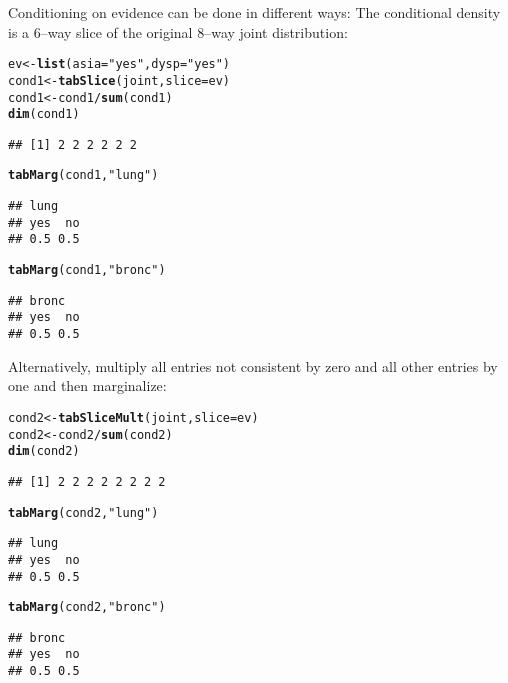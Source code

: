 \documentclass[10pt]{article}\usepackage[]{graphicx}\usepackage[]{xcolor}
\makeatletter
\newcommand{\hlstr}[1]{\textcolor[rgb]{0.192,0.494,0.8}{#1}}%
\newcommand{\hlopt}[1]{\textcolor[rgb]{0,0,0}{#1}}%
\newcommand{\hlstd}[1]{\textcolor[rgb]{0.345,0.345,0.345}{#1}}%
\newcommand{\hlkwb}[1]{\textcolor[rgb]{0.69,0.353,0.396}{#1}}%
\newcommand{\hlkwc}[1]{\textcolor[rgb]{0.333,0.667,0.333}{#1}}%
\newcommand{\hlkwd}[1]{\textcolor[rgb]{0.737,0.353,0.396}{\textbf{#1}}}%
\newenvironment{kframe}{%
 \def\at@end@of@kframe{}%
 \ifinner\ifhmode%
  \def\at@end@of@kframe{\end{minipage}}%
  \begin{minipage}{\columnwidth}%
 \fi\fi%
 \def\FrameCommand##1{\hskip\@totalleftmargin \hskip-\fboxsep
 \colorbox{shadecolor}{##1}\hskip-\fboxsep
     \hskip-\linewidth \hskip-\@totalleftmargin \hskip\columnwidth}%
 \MakeFramed {\advance\hsize-\width
   \@totalleftmargin\z@ \linewidth\hsize
   \@setminipage}}%
 {\par\unskip\endMakeFramed%
 \at@end@of@kframe}
\newenvironment{knitrout}{}{} %
\makeatother
\begin{document}
Conditioning on evidence can be done in different ways: The conditional density is a $6$--way slice of the original $8$--way joint distribution:
\begin{knitrout}
\color{fgcolor}\begin{kframe}
\begin{alltt}
\hlstd{ev} \hlkwb{<-} \hlkwd{list}\hlstd{(}\hlkwc{asia}\hlstd{=}\hlstr{"yes"}\hlstd{,} \hlkwc{dysp}\hlstd{=}\hlstr{"yes"}\hlstd{)}
\hlstd{cond1} \hlkwb{<-} \hlkwd{tabSlice}\hlstd{(joint,} \hlkwc{slice}\hlstd{=ev)}
\hlstd{cond1} \hlkwb{<-} \hlstd{cond1} \hlopt{/} \hlkwd{sum}\hlstd{(cond1)}
\hlkwd{dim}\hlstd{(cond1)}
\end{alltt}
\begin{verbatim}
## [1] 2 2 2 2 2 2
\end{verbatim}
\begin{alltt}
\hlkwd{tabMarg}\hlstd{(cond1,} \hlstr{"lung"}\hlstd{)}
\end{alltt}
\begin{verbatim}
## lung
## yes  no 
## 0.5 0.5
\end{verbatim}
\begin{alltt}
\hlkwd{tabMarg}\hlstd{(cond1,} \hlstr{"bronc"}\hlstd{)}
\end{alltt}
\begin{verbatim}
## bronc
## yes  no 
## 0.5 0.5
\end{verbatim}
\end{kframe}
\end{knitrout}

Alternatively, multiply all entries not consistent by zero and all other entries by one and then marginalize:
\begin{knitrout}
\color{fgcolor}\begin{kframe}
\begin{alltt}
\hlstd{cond2} \hlkwb{<-} \hlkwd{tabSliceMult}\hlstd{(joint,} \hlkwc{slice}\hlstd{=ev)}
\hlstd{cond2} \hlkwb{<-} \hlstd{cond2} \hlopt{/} \hlkwd{sum}\hlstd{(cond2)}
\hlkwd{dim}\hlstd{(cond2)}
\end{alltt}
\begin{verbatim}
## [1] 2 2 2 2 2 2 2 2
\end{verbatim}
\begin{alltt}
\hlkwd{tabMarg}\hlstd{(cond2,} \hlstr{"lung"}\hlstd{)}
\end{alltt}
\begin{verbatim}
## lung
## yes  no 
## 0.5 0.5
\end{verbatim}
\begin{alltt}
\hlkwd{tabMarg}\hlstd{(cond2,} \hlstr{"bronc"}\hlstd{)}
\end{alltt}
\begin{verbatim}
## bronc
## yes  no 
## 0.5 0.5
\end{verbatim}
\end{kframe}
\end{knitrout}
\end{document}
